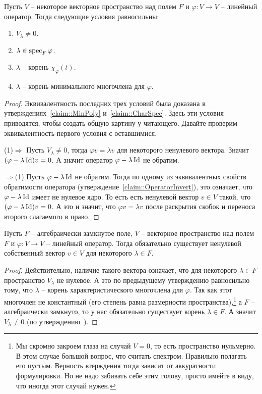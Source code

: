 \begin{claim}\label{claim::EigenSpec}
Пусть $V$ -- некоторое векторное пространство над полем $F$ и $\varphi \colon V\to V$ -- линейный оператор. Тогда следующие условия равносильны:
\begin{enumerate}
\item $V_\lambda \neq 0$. 
\item $\lambda \in \operatorname{spec}_F\varphi$.
\item $\lambda$ -- корень $\chi_\varphi(t)$.
\item $\lambda$ -- корень минимального многочлена для $\varphi$.
\end{enumerate}
\end{claim}
\begin{proof}
Эквивалентность последних трех условий была доказана в утверждениях~\ref{claim::MinPoly} и~\ref{claim::CharSpec}. Здесь эти условия приводятся, чтобы создать общую картину у читающего. Давайте проверим эквивалентность первого условия с оставшимися.

(1)$\Rightarrow$ Пусть $V_\lambda \neq 0$, тогда $\varphi v = \lambda v$ для некоторого ненулевого вектора. Значит $(\varphi - \lambda \operatorname{Id})v = 0$. А значит оператор $\varphi - \lambda \operatorname{Id}$ не обратим.

$\Rightarrow$(1) Пусть $\varphi -\lambda \operatorname{Id}$ не обратим. Тогда по одному из эквивалентных свойств обратимости оператора (утверждение~\ref{claim::OperatorInvert}), это означает, что $\varphi - \lambda \operatorname{Id}$ имеет не нулевое ядро. То есть есть ненулевой вектор $v\in V$ такой, что $(\varphi - \lambda \operatorname{Id})v = 0$. А это и значит, что $\varphi v = \lambda v$ после раскрытия скобок и переноса второго слагаемого в право.
\end{proof}


\begin{claim}
Пусть $F$ -- алгебраически замкнутое поле, $V$ -- векторное пространство над полем $F$ и $\varphi\colon V\to V$ -- линейный оператор. Тогда обязательно существует ненулевой собственный вектор $v\in V$ для некоторого $\lambda\in F$.
\end{claim}
\begin{proof}
Действительно, наличие такого вектора означает, что для некоторого $\lambda\in F$ пространство $V_\lambda$ не нулевое. А это по предыдущему утверждению равносильно тому, что $\lambda$ -- корень характеристического многочлена для $\varphi$. Так как этот многочлен не константный (его степень равна размерности пространства),\footnote{Мы скромно закроем глаза на случай $V = 0$, то есть пространство нульмерно. В этом случае большой вопрос, что считать спектром. Правильно полагать его пустым. Верность втерждения тогда зависит от аккуратности формулировки. Но не надо забивать себе этим голову, просто имейте в виду, что иногда этот случай нужен.} а $F$ -- алгебраически замкнуто, то у нас обязательно существует корень $\lambda\in F$. А значит $V_\lambda \neq 0$ (по утверждению~\label{claim::EigenSpec}).
\end{proof}

